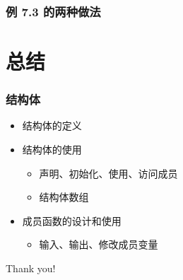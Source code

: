 \begin{frame}[fragile]
    \frametitle{例 7.3 的两种做法}
    
\end{frame}

\section{总结}

\begin{frame}[fragile]
    \frametitle{结构体}

    \begin{itemize}
        \item<1-> 结构体的定义
        \item<2-> 结构体的使用
            \begin{itemize}
                \item 声明、初始化、使用、访问成员
                \item 结构体数组
            \end{itemize}
       \item<3-> 成员函数的设计和使用
            \begin{itemize}
                \item 输入、输出、修改成员变量
            \end{itemize}
    \end{itemize}
\end{frame}

\begin{frame}
    \begin{center}
        {\Huge Thank you!}
    \end{center}
\end{frame}


